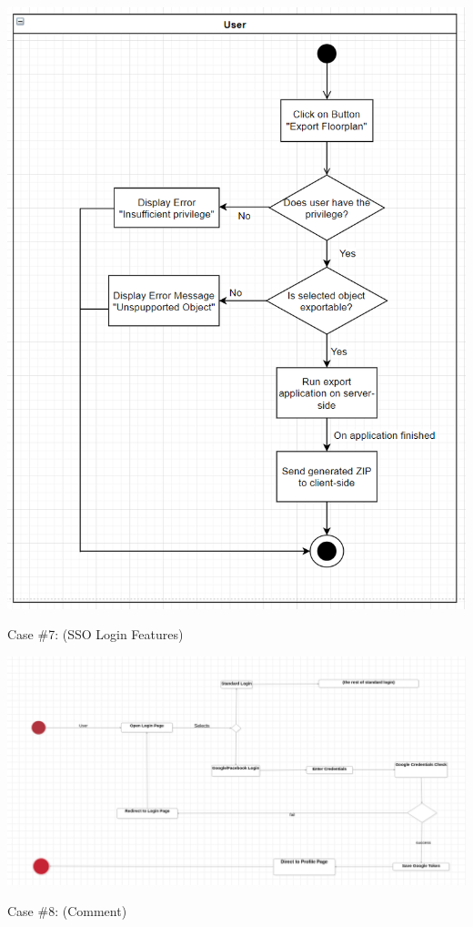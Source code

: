             \includegraphics[width=\textwidth]{images/case2.png}
        
        	\newpage
			\noindent Case \#7:
			(SSO Login Features)
			
			\includegraphics[width=\textwidth]{images/sso.png}
			
			\noindent Case \#8:
			(Comment)
			
